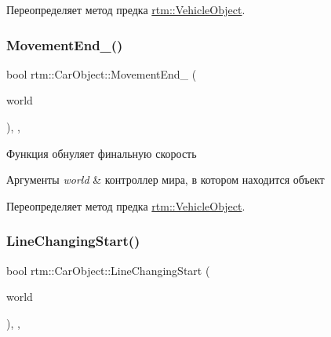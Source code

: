 Переопределяет метод предка \hyperlink{classrtm_1_1_vehicle_object_a06a920b3fe0df4fa4ca0687a9366426a}{rtm\+::\+Vehicle\+Object}.

\mbox{\label{classrtm_1_1_car_object_a24354013f953386699bbb3f4464adb0c}} 
\subsubsection{\texorpdfstring{Movement\+End\+\_\+()}{MovementEnd\_()}}
{\footnotesize\ttfamily bool rtm\+::\+Car\+Object\+::\+Movement\+End\+\_\+ (\begin{DoxyParamCaption}\item[{\hyperlink{classrtm_1_1_world_controller}{World\+Controller} $\ast$const}]{world }\end{DoxyParamCaption})\hspace{0.3cm}{\ttfamily [override]}, {\ttfamily [protected]}, {\ttfamily [virtual]}}



Функция обнуляет финальную скорость 


\begin{DoxyParams}{Аргументы}
{\em world} & контроллер мира, в котором находится объект \\
\hline
\end{DoxyParams}


Переопределяет метод предка \hyperlink{classrtm_1_1_vehicle_object_a7e6c94902d1d544006ca8de63ba36860}{rtm\+::\+Vehicle\+Object}.

\mbox{\label{classrtm_1_1_car_object_a34063664a03d36d1308c80e064d1ae61}} 
\subsubsection{\texorpdfstring{Line\+Changing\+Start()}{LineChangingStart()}}
{\footnotesize\ttfamily bool rtm\+::\+Car\+Object\+::\+Line\+Changing\+Start (\begin{DoxyParamCaption}\item[{\hyperlink{classrtm_1_1_world_controller}{World\+Controller} $\ast$const}]{world }\end{DoxyParamCaption})\hspace{0.3cm}{\ttfamily [override]}, {\ttfamily [protected]}, {\ttfamily [virtual]}}



